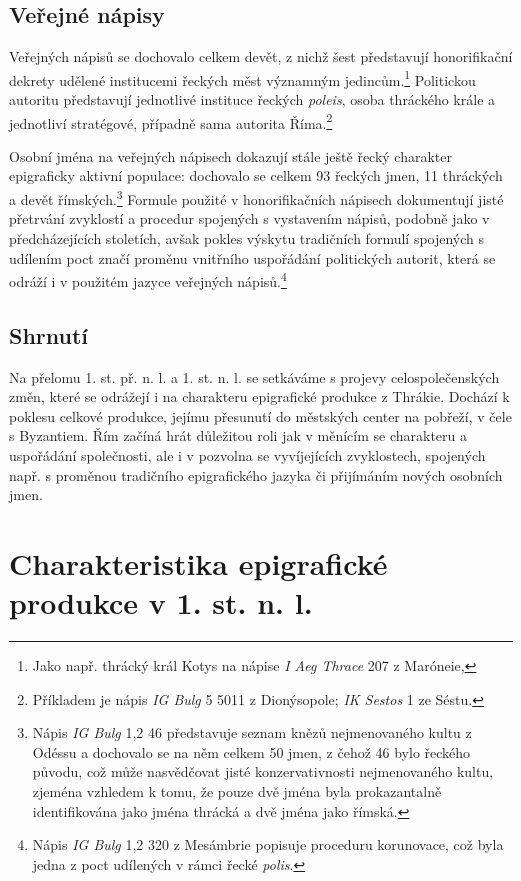 \subsection[veřejné-nápisy-10]{Veřejné nápisy}

Veřejných nápisů se dochovalo celkem devět, z nichž šest představují honorifikační dekrety udělené institucemi řeckých měst významným jedincům.\footnote{Jako např. thrácký král Kotys na nápise {\em I Aeg Thrace} 207 z Maróneie,} Politickou autoritu představují jednotlivé instituce řeckých {\em poleis}, osoba thráckého krále a jednotliví stratégové, případně sama autorita Říma.\footnote{Příkladem je nápis {\em IG Bulg} 5 5011 z Dionýsopole; {\em IK Sestos} 1 ze Séstu.}

Osobní jména na veřejných nápisech dokazují stále ještě řecký charakter epigraficky aktivní populace: dochovalo se celkem 93 řeckých jmen, 11 thráckých a devět římských.\footnote{Nápis {\em IG Bulg} 1,2 46 představuje seznam knězů nejmenovaného kultu z Odéssu a dochovalo se na něm celkem 50 jmen, z čehož 46 bylo řeckého původu, což může nasvědčovat jisté konzervativnosti nejmenovaného kultu, zjeména vzhledem k tomu, že pouze dvě jména byla prokazantalně identifikována jako jména thrácká a dvě jména jako římská.} Formule použité v honorifikačních nápisech dokumentují jisté přetrvání zvyklostí a procedur spojených s vystavením nápisů, podobně jako v předcházejících stoletích, avšak pokles výskytu tradičních formulí spojených s udílením poct značí proměnu vnitřního uspořádání politických autorit, která se odráží i v použitém jazyce veřejných nápisů.\footnote{Nápis {\em IG Bulg} 1,2 320 z Mesámbrie popisuje proceduru korunovace, což byla jedna z poct udílených v rámci řecké {\em polis}.}

\subsection[shrnutí-14]{Shrnutí}

Na přelomu 1. st. př. n. l. a 1. st. n. l. se setkáváme s projevy celospolečenských změn, které se odrážejí i na charakteru epigrafické produkce z Thrákie. Dochází k poklesu celkové produkce, jejímu přesunutí do městských center na pobřeží, v čele s Byzantiem. Řím začíná hrát důležitou roli jak v měnícím se charakteru a uspořádání společnosti, ale i v pozvolna se vyvíjejících zvyklostech, spojených např. s proměnou tradičního epigrafického jazyka či přijímáním nových osobních jmen.

\section[charakteristika-epigrafické-produkce-v-1.-st.-n.-l.]{Charakteristika epigrafické produkce v 1. st. n. l.}

